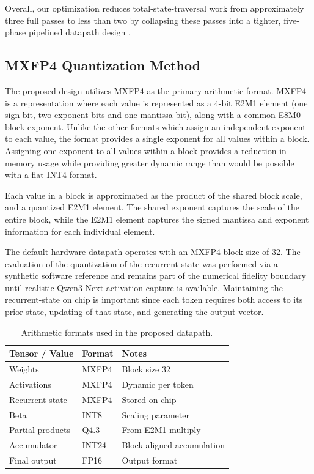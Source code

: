﻿\documentclass[conference]{IEEEtran}
\begin{document}
Overall, our optimization reduces total-state-traversal work from approximately three full passes to less than two by collapsing these passes into a tighter, five-phase pipelined datapath design \cite{b10}.

\subsection{MXFP4 Quantization Method}
The proposed design utilizes MXFP4 as the primary arithmetic format. MXFP4 is a representation where each value is represented as a 4-bit E2M1 element (one sign bit, two exponent bits and one mantissa bit), along with a common E8M0 block exponent. Unlike the other formats which assign an independent exponent to each value, the format provides a single exponent for all values within a block. Assigning one exponent to all values within a block provides a reduction in memory usage while providing greater dynamic range than would be possible with a flat INT4 format.

Each value in a block is approximated as the product of the shared block scale, and a quantized E2M1 element. The shared exponent captures the scale of the entire block, while the E2M1 element captures the signed mantissa and exponent information for each individual element.

The default hardware datapath operates with an MXFP4 block size of 32. The evaluation of the quantization of the recurrent-state was performed via a synthetic software reference and remains part of the numerical fidelity boundary until realistic Qwen3-Next activation capture is available. Maintaining the recurrent-state on chip is important since each token requires both access to its prior state, updating of that state, and generating the output vector.

\begin{table}[t]
\centering
\caption{Arithmetic formats used in the proposed datapath.}
\label{tab:data_formats}
\begin{tabular}{lll}
\hline
Tensor / Value & Format & Notes \\
\hline
Weights & MXFP4 & Block size 32 \\
Activations & MXFP4 & Dynamic per token \\
Recurrent state & MXFP4 & Stored on chip \\
Beta & INT8 & Scaling parameter \\
Partial products & Q4.3 & From E2M1 multiply \\
Accumulator & INT24 & Block-aligned accumulation \\
Final output & FP16 & Output format \\
\hline
\end{tabular}
\end{table}
\end{document}
